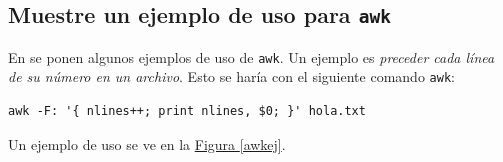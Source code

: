 \documentclass[10pt,a4paper,spanish]{article}
\numberwithin{equation}{section} %
\numberwithin{figure}{section} %
\numberwithin{table}{section} %
\begin{document}







\subsection{Muestre un ejemplo de uso para \texttt{awk}}
En \cite{manawk} se ponen algunos ejemplos de uso de \texttt{awk}. Un ejemplo es \textit{preceder cada línea de su número en un archivo}. Esto se haría con el siguiente comando \texttt{awk}:
\begin{verbatim}
awk -F: '{ nlines++; print nlines, $0; }' hola.txt
\end{verbatim}

Un ejemplo de uso se ve en la \hyperref[awkej]{Figura \ref*{awkej}}.
\end{document}
